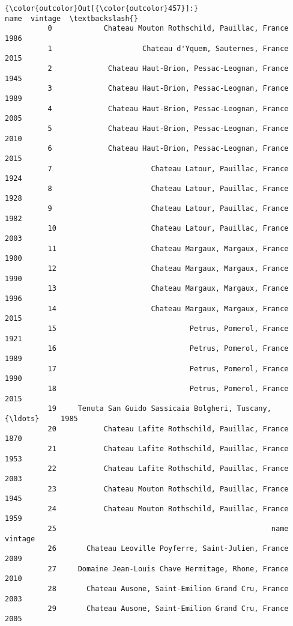 \documentclass[11pt]{article}
\begin{document}
\begin{Verbatim}[commandchars=\\\{\}]
{\color{outcolor}Out[{\color{outcolor}457}]:}                                                     name  vintage  \textbackslash{}
          0            Chateau Mouton Rothschild, Pauillac, France     1986   
          1                     Chateau d'Yquem, Sauternes, France     2015   
          2             Chateau Haut-Brion, Pessac-Leognan, France     1945   
          3             Chateau Haut-Brion, Pessac-Leognan, France     1989   
          4             Chateau Haut-Brion, Pessac-Leognan, France     2005   
          5             Chateau Haut-Brion, Pessac-Leognan, France     2010   
          6             Chateau Haut-Brion, Pessac-Leognan, France     2015   
          7                       Chateau Latour, Pauillac, France     1924   
          8                       Chateau Latour, Pauillac, France     1928   
          9                       Chateau Latour, Pauillac, France     1982   
          10                      Chateau Latour, Pauillac, France     2003   
          11                      Chateau Margaux, Margaux, France     1900   
          12                      Chateau Margaux, Margaux, France     1990   
          13                      Chateau Margaux, Margaux, France     1996   
          14                      Chateau Margaux, Margaux, France     2015   
          15                               Petrus, Pomerol, France     1921   
          16                               Petrus, Pomerol, France     1989   
          17                               Petrus, Pomerol, France     1990   
          18                               Petrus, Pomerol, France     2015   
          19     Tenuta San Guido Sassicaia Bolgheri, Tuscany, {\ldots}     1985   
          20           Chateau Lafite Rothschild, Pauillac, France     1870   
          21           Chateau Lafite Rothschild, Pauillac, France     1953   
          22           Chateau Lafite Rothschild, Pauillac, France     2003   
          23           Chateau Mouton Rothschild, Pauillac, France     1945   
          24           Chateau Mouton Rothschild, Pauillac, France     1959   
          25                                                  name  vintage   
          26       Chateau Leoville Poyferre, Saint-Julien, France     2009   
          27     Domaine Jean-Louis Chave Hermitage, Rhone, France     2010   
          28       Chateau Ausone, Saint-Emilion Grand Cru, France     2003   
          29       Chateau Ausone, Saint-Emilion Grand Cru, France     2005   

\end{Verbatim}
\end{document}
